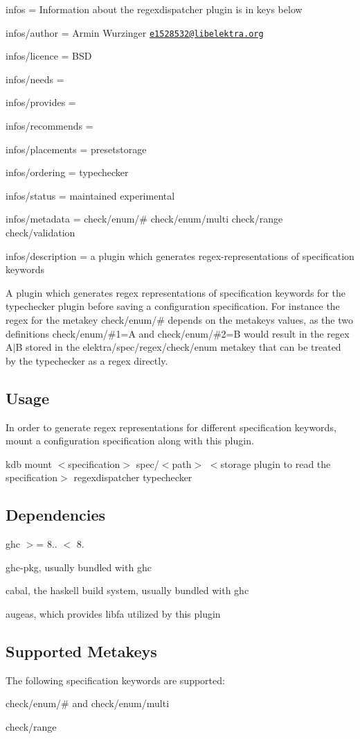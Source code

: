 
\begin{DoxyItemize}
\item infos = Information about the regexdispatcher plugin is in keys below
\item infos/author = Armin Wurzinger \href{mailto:e1528532@libelektra.org}{\tt e1528532@libelektra.\+org}
\item infos/licence = B\+SD
\item infos/needs =
\item infos/provides =
\item infos/recommends =
\item infos/placements = presetstorage
\item infos/ordering = typechecker
\item infos/status = maintained experimental
\item infos/metadata = check/enum/\# check/enum/multi check/range check/validation
\item infos/description = a plugin which generates regex-\/representations of specification keywords
\end{DoxyItemize}

A plugin which generates regex representations of specification keywords for the typechecker plugin before saving a configuration specification. For instance the regex for the metakey {\ttfamily check/enum/\#} depends on the metakey\textquotesingle{}s values, as the two definitions {\ttfamily check/enum/\#1=A} and {\ttfamily check/enum/\#2=B} would result in the regex {\ttfamily A$\vert$B} stored in the {\ttfamily elektra/spec/regex/check/enum} metakey that can be treated by the typechecker as a regex directly.

\subsection*{Usage}

In order to generate regex representations for different specification keywords, mount a configuration specification along with this plugin.

{\ttfamily kdb mount $<$specification$>$ spec/$<$path$>$ $<$storage plugin to read the specification$>$ regexdispatcher typechecker}

\subsection*{Dependencies}


\begin{DoxyItemize}
\item ghc $>$= 8.. $<$ 8.
\item ghc-\/pkg, usually bundled with ghc
\item cabal, the haskell build system, usually bundled with ghc
\item augeas, which provides libfa utilized by this plugin
\end{DoxyItemize}

\subsection*{Supported Metakeys}

The following specification keywords are supported\+:


\begin{DoxyItemize}
\item check/enum/\# and check/enum/multi
\item check/range 
\end{DoxyItemize}